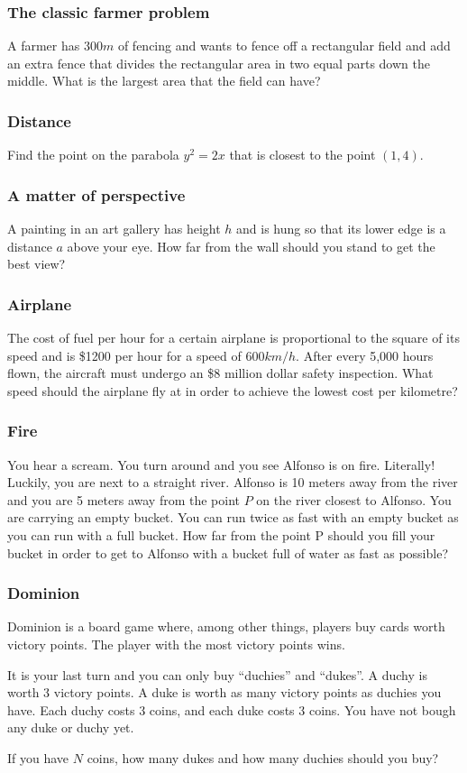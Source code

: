 \documentclass[14pt]{beamer}
\begin{document}
\begin{frame}[t]
	\frametitle{The classic farmer problem}

	A farmer has $300m$ of fencing and wants to fence off a rectangular field and
	add an extra fence that divides the rectangular area in two equal parts down
	the middle. What is the largest area that the field can have?
\end{frame}

\begin{frame}[t]
	\frametitle{Distance}

	Find the point on the parabola $y^{2}=2x$ that is closest to the point $(1,4)$.
\end{frame}

\begin{frame}[t]
	\frametitle{A matter of perspective}

	A painting in an art gallery has height $h$ and is hung so that its lower edge
	is a distance $a$ above your eye. How far from the wall should you stand to get
	the best view?
\end{frame}

\begin{frame}[t]
	\frametitle{Airplane}

	The cost of fuel per hour for a certain airplane is proportional to the square
	of its speed and is \$1200 per hour for a speed of 600$km/h$. After every 5,000
	hours flown, the aircraft must undergo an \$8 million dollar safety inspection.
	What speed should the airplane fly at in order to achieve the lowest cost per
	kilometre?
\end{frame}

\begin{frame}[t]
	\frametitle{Fire}

	You hear a scream. You turn around and you see Alfonso is on fire. Literally! Luckily,
	you are next to a straight river. Alfonso is 10 meters away from the river and
	you are 5 meters away from the point $P$ on the river closest to Alfonso. You
	are carrying an empty bucket. You can run twice as fast with an empty bucket as
	you can run with a full bucket. How far from the point P should you fill your
	bucket in order to get to Alfonso with a bucket full of water as fast as
	possible?

\end{frame}

\begin{frame}[t]
	\frametitle{Dominion}

	Dominion is a board game where, among other things, players buy cards worth
	victory points. The player with the most victory points wins.

	It is your last turn and you can only buy ``duchies'' and ``dukes''. A duchy
	is worth 3 victory points. A duke is worth as many victory points as duchies you
	have. Each duchy costs 3 coins, and each duke costs 3 coins. You have not
	bough any duke or duchy yet.

	If you have $N$ coins, how many dukes and how many duchies should you buy?
\end{frame}
\end{document}
